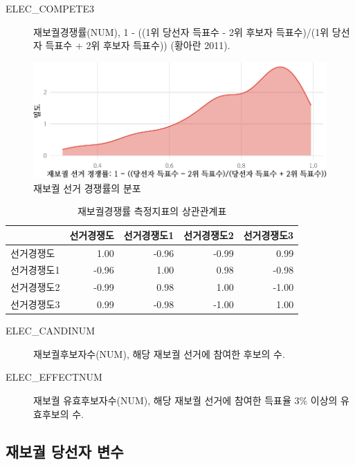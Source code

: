 \documentclass[
  11pt,
  letter]{article}
\begin{document}
\begin{description}
\item[ELEC\_COMPETE3]
재보궐경쟁률(NUM), 1 - ((1위 당선자 득표수 - 2위 후보자 득표수)/(1위
당선자 득표수 + 2위 후보자 득표수)) (황아란 2011).
\end{description}

\begin{figure}
\centering
\includegraphics{Codebook_national_files/figure-latex/unnamed-chunk-10-1.pdf}
\caption{재보궐 선거 경쟁률의 분포}
\end{figure}

\begin{longtable}[t]{l|r|r|r|r}
\caption{\label{tab:unnamed-chunk-11}재보궐경쟁률 측정지표의 상관관계표}\\
\hline
  & 선거경쟁도 & 선거경쟁도1 & 선거경쟁도2 & 선거경쟁도3\\
\hline
선거경쟁도 & 1.00 & -0.96 & -0.99 & 0.99\\
\hline
선거경쟁도1 & -0.96 & 1.00 & 0.98 & -0.98\\
\hline
선거경쟁도2 & -0.99 & 0.98 & 1.00 & -1.00\\
\hline
선거경쟁도3 & 0.99 & -0.98 & -1.00 & 1.00\\
\hline
\end{longtable}

\begin{description}
\item[ELEC\_CANDINUM]
재보궐후보자수(NUM), 해당 재보궐 선거에 참여한 후보의 수.
\item[ELEC\_EFFECTNUM]
재보궐 유효후보자수(NUM), 해당 재보궐 선거에 참여한 득표율 3\% 이상의
유효후보의 수.
\end{description}

\newpage

\hypertarget{uxc7acuxbcf4uxad90-uxb2f9uxc120uxc790-uxbcc0uxc218}{%
\subsection{재보궐 당선자
변수}\label{uxc7acuxbcf4uxad90-uxb2f9uxc120uxc790-uxbcc0uxc218}}
\end{document}
